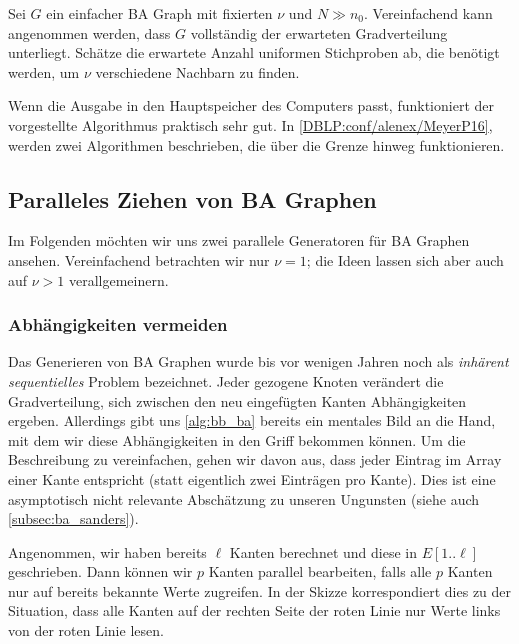 \begin{exercise}
    Sei $G$ ein einfacher BA Graph mit fixierten $\nu$ und $N \gg n_0$.
    Vereinfachend kann angenommen werden, dass $G$ vollständig der erwarteten Gradverteilung unterliegt.
    Schätze die erwartete Anzahl uniformen Stichproben ab, die benötigt werden, um $\nu$ verschiedene Nachbarn zu finden.
\end{exercise}

Wenn die Ausgabe in den Hauptspeicher des Computers passt, funktioniert der vorgestellte Algorithmus praktisch sehr gut.
In \cref{DBLP:conf/alenex/MeyerP16}, werden zwei Algorithmen beschrieben, die über die Grenze hinweg funktionieren.

\subsection{Paralleles Ziehen von BA Graphen}
Im Folgenden möchten wir uns zwei parallele Generatoren für BA Graphen ansehen.
Vereinfachend betrachten wir nur $\nu = 1$; die Ideen lassen sich aber auch auf $\nu > 1$ verallgemeinern.

\subsubsection{Abhängigkeiten vermeiden}
Das Generieren von BA Graphen wurde bis vor wenigen Jahren noch als \emph{inhärent sequentielles} Problem bezeichnet.
Jeder gezogene Knoten verändert die Gradverteilung, \sd sich zwischen den neu eingefügten Kanten Abhängigkeiten ergeben.
Allerdings gibt uns \cref{alg:bb_ba} bereits ein mentales Bild an die Hand, mit dem wir diese Abhängigkeiten in den Griff bekommen können.
Um die Beschreibung zu vereinfachen, gehen wir davon aus, dass jeder Eintrag im Array einer Kante entspricht (statt eigentlich zwei Einträgen pro Kante).
Dies ist eine asymptotisch nicht relevante Abschätzung zu unseren Ungunsten (siehe auch \cref{subsec:ba_sanders}).

Angenommen, wir haben bereits $\ell$ Kanten berechnet und diese in $E[1..\ell]$ geschrieben.
Dann können wir $p$ Kanten parallel bearbeiten, falls alle $p$ Kanten nur auf bereits bekannte Werte zugreifen.
In der Skizze korrespondiert dies zu der Situation, dass alle Kanten auf der rechten Seite der roten Linie nur Werte links von der roten Linie lesen.

